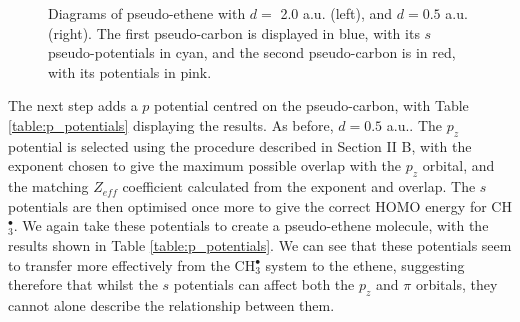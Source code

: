 \documentclass[aip]{revtex4-1}
\begin{document}
\begin{figure}
\begin{center}
%
\end{center}
\caption{Diagrams of pseudo-ethene with \(d =\) 2.0 a.u. (left), and \(d = 0.5\) a.u. (right). The first pseudo-carbon is displayed in blue, with its \(s\) pseudo-potentials in cyan, and the second pseudo-carbon is in red, with its potentials in pink.}
\label{fig:long_r_ethene}
\end{figure}

The next step adds a \(p\) potential centred on the pseudo-carbon, with Table \ref{table:p_potentials} displaying the results. As before, \(d = 0.5\) a.u.. The \(p_{z}\) potential is selected using the procedure described in Section II B, with the exponent chosen to give the maximum possible overlap with the \(p_{z}\) orbital, and the matching \(Z_{eff}\) coefficient calculated from the exponent and overlap. The \(s\) potentials are then optimised once more to give the correct HOMO energy for CH\(^{\bullet}_{3}\). We again take these potentials to create a pseudo-ethene molecule, with the results shown in Table \ref{table:p_potentials}. We can see that these potentials seem to transfer more effectively from the CH\(^{\bullet}_{3}\) system to the ethene, suggesting therefore that whilst the \(s\) potentials can affect both the \(p_{z}\) and \(\pi\) orbitals, they 
cannot alone describe the relationship between them.
\end{document}
